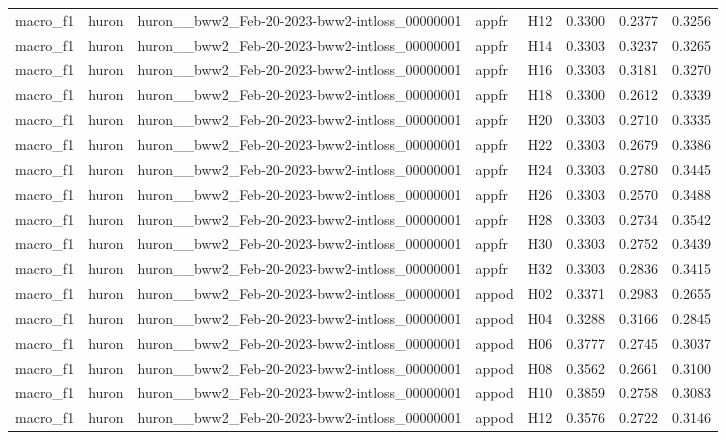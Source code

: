 \begin{table}[tbp]
\begin{tabular}{lllllrrr}
macro\_f1 & huron & huron\_\_bww2\_Feb-20-2023-bww2-intloss\_00000001 & appfr & H12 & 0.3300 & 0.2377 & 0.3256 \\
macro\_f1 & huron & huron\_\_bww2\_Feb-20-2023-bww2-intloss\_00000001 & appfr & H14 & 0.3303 & 0.3237 & 0.3265 \\
macro\_f1 & huron & huron\_\_bww2\_Feb-20-2023-bww2-intloss\_00000001 & appfr & H16 & 0.3303 & 0.3181 & 0.3270 \\
macro\_f1 & huron & huron\_\_bww2\_Feb-20-2023-bww2-intloss\_00000001 & appfr & H18 & 0.3300 & 0.2612 & 0.3339 \\
macro\_f1 & huron & huron\_\_bww2\_Feb-20-2023-bww2-intloss\_00000001 & appfr & H20 & 0.3303 & 0.2710 & 0.3335 \\
macro\_f1 & huron & huron\_\_bww2\_Feb-20-2023-bww2-intloss\_00000001 & appfr & H22 & 0.3303 & 0.2679 & 0.3386 \\
macro\_f1 & huron & huron\_\_bww2\_Feb-20-2023-bww2-intloss\_00000001 & appfr & H24 & 0.3303 & 0.2780 & 0.3445 \\
macro\_f1 & huron & huron\_\_bww2\_Feb-20-2023-bww2-intloss\_00000001 & appfr & H26 & 0.3303 & 0.2570 & 0.3488 \\
macro\_f1 & huron & huron\_\_bww2\_Feb-20-2023-bww2-intloss\_00000001 & appfr & H28 & 0.3303 & 0.2734 & 0.3542 \\
macro\_f1 & huron & huron\_\_bww2\_Feb-20-2023-bww2-intloss\_00000001 & appfr & H30 & 0.3303 & 0.2752 & 0.3439 \\
macro\_f1 & huron & huron\_\_bww2\_Feb-20-2023-bww2-intloss\_00000001 & appfr & H32 & 0.3303 & 0.2836 & 0.3415 \\
macro\_f1 & huron & huron\_\_bww2\_Feb-20-2023-bww2-intloss\_00000001 & appod & H02 & 0.3371 & 0.2983 & 0.2655 \\
macro\_f1 & huron & huron\_\_bww2\_Feb-20-2023-bww2-intloss\_00000001 & appod & H04 & 0.3288 & 0.3166 & 0.2845 \\
macro\_f1 & huron & huron\_\_bww2\_Feb-20-2023-bww2-intloss\_00000001 & appod & H06 & 0.3777 & 0.2745 & 0.3037 \\
macro\_f1 & huron & huron\_\_bww2\_Feb-20-2023-bww2-intloss\_00000001 & appod & H08 & 0.3562 & 0.2661 & 0.3100 \\
macro\_f1 & huron & huron\_\_bww2\_Feb-20-2023-bww2-intloss\_00000001 & appod & H10 & 0.3859 & 0.2758 & 0.3083 \\
macro\_f1 & huron & huron\_\_bww2\_Feb-20-2023-bww2-intloss\_00000001 & appod & H12 & 0.3576 & 0.2722 & 0.3146 \\

\end{tabular}
\end{table}
